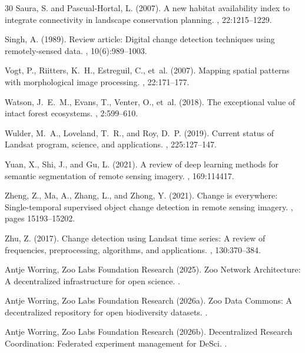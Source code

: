 \begin{thebibliography}{30}
Saura, S. and Pascual-Hortal, L. (2007).
\newblock A new habitat availability index to integrate connectivity in landscape conservation planning.
, 22:1215--1229.

Singh, A. (1989).
\newblock Review article: Digital change detection techniques using remotely-sensed data.
, 10(6):989--1003.

Vogt, P., Riitters, K.~H., Estreguil, C., et~al. (2007).
\newblock Mapping spatial patterns with morphological image processing.
, 22:171--177.

Watson, J.~E.~M., Evans, T., Venter, O., et~al. (2018).
\newblock The exceptional value of intact forest ecosystems.
, 2:599--610.

Wulder, M.~A., Loveland, T.~R., and Roy, D.~P. (2019).
\newblock Current status of Landsat program, science, and applications.
, 225:127--147.

Yuan, X., Shi, J., and Gu, L. (2021).
\newblock A review of deep learning methods for semantic segmentation of remote sensing imagery.
, 169:114417.

Zheng, Z., Ma, A., Zhang, L., and Zhong, Y. (2021).
\newblock Change is everywhere: Single-temporal supervised object change detection in remote sensing imagery.
, pages 15193--15202.

Zhu, Z. (2017).
\newblock Change detection using Landsat time series: A review of frequencies, preprocessing, algorithms, and applications.
, 130:370--384.

Antje Worring, Zoo Labs Foundation Research (2025).
\newblock Zoo Network Architecture: A decentralized infrastructure for open science.
.

Antje Worring, Zoo Labs Foundation Research (2026a).
\newblock Zoo Data Commons: A decentralized repository for open biodiversity datasets.
.

Antje Worring, Zoo Labs Foundation Research (2026b).
\newblock Decentralized Research Coordination: Federated experiment management for DeSci.
.

\end{thebibliography}

